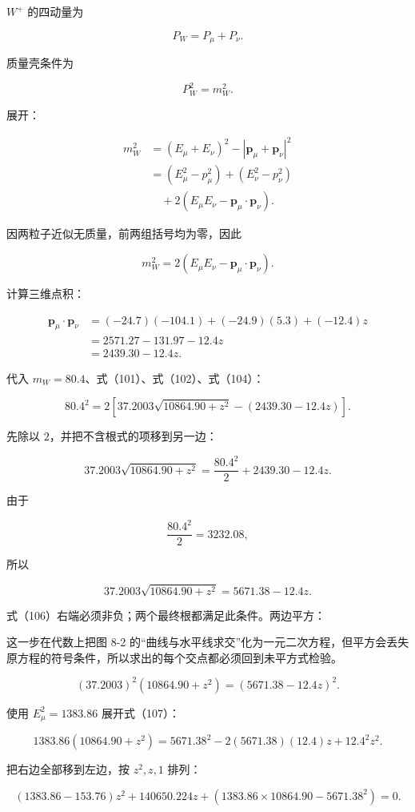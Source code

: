 \documentclass[12pt,a4paper,UTF8]{ctexart}
\begin{document}
\(W^+\) 的四动量为

\[P_W=P_\mu+P_\nu.\]

质量壳条件为

\[P_W^2=m_W^2.\]

展开：

\[\begin{aligned}
m_W^2
&=(E_\mu+E_\nu)^2
-|\bm p_\mu+\bm p_\nu|^2\\
&=(E_\mu^2-p_\mu^2)+(E_\nu^2-p_\nu^2)\\
&\quad+2(E_\mu E_\nu-\bm p_\mu\cdot\bm p_\nu).
\end{aligned}\]

因两粒子近似无质量，前两组括号均为零，因此

\[m_W^2=2(E_\mu E_\nu-\bm p_\mu\cdot\bm p_\nu). \tag{103}\]

计算三维点积：

\[\begin{aligned}
\bm p_\mu\cdot\bm p_\nu
&=(-24.7)(-104.1)+(-24.9)(5.3)+(-12.4)z\\
&=2571.27-131.97-12.4z\\
&=2439.30-12.4z.
\end{aligned} \tag{104}\]

代入 \(m_W=80.4\)、式（101）、式（102）、式（104）：

\[80.4^2
=2\left[37.2003\sqrt{10864.90+z^2}
-(2439.30-12.4z)\right]. \tag{105}\]

先除以 \(2\)，并把不含根式的项移到另一边：

\[37.2003\sqrt{10864.90+z^2}
=\frac{80.4^2}{2}+2439.30-12.4z.\]

由于

\[\frac{80.4^2}{2}=3232.08,\]

所以

\[37.2003\sqrt{10864.90+z^2}
=5671.38-12.4z. \tag{106}\]

式（106）右端必须非负；两个最终根都满足此条件。两边平方：

这一步在代数上把图 8-2
的``曲线与水平线求交''化为一元二次方程，但平方会丢失原方程的符号条件，所以求出的每个交点都必须回到未平方式检验。

\[(37.2003)^2(10864.90+z^2)
=(5671.38-12.4z)^2. \tag{107}\]

使用 \(E_\mu^2=1383.86\) 展开式（107）：

\[1383.86(10864.90+z^2)
=5671.38^2-2(5671.38)(12.4)z+12.4^2z^2.\]

把右边全部移到左边，按 \(z^2,z,1\) 排列：

\[\left(1383.86-153.76\right)z^2
+140650.224z
+\left(1383.86\times10864.90-5671.38^2\right)=0.\]
\end{document}
